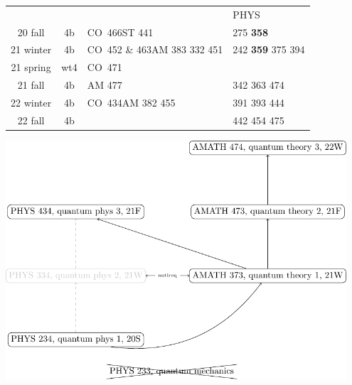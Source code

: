 \documentclass{article}
\newcommand{\co}[1]{{\color{red}CO~#1}}
\begin{document}
\pagestyle{empty}
\begin{table}[h!]
\centering
{}
\begin{adjustbox}{width=\textwidth}
\begin{tabular}{|c | c  | l | l| }
	\hline
	&     &                              & PHYS                                           \\
	20 fall  & 4b  & \co{466}\quad ST 441         & {\tiny 275}  {\bfseries 358}                   \\
	21 winter & 4b  & \co{452 \& 463}\quad  AM 383 {\tiny332 451} &  242 {\bfseries359} {\tiny 375} {\tiny 394} \\
	21 spring & wt4 & \co{471}      &   \\
	21 fall  & 4b  & AM 477 &  342 363  {\tiny 474}  \\
	22 winter & 4b  & \co{434}\quad AM 382 {\tiny 455}         & 391  393 {\tiny 444}            \\
	22 fall  & 4b  &    &  442  454  {\tiny 475} \\ \hline
\end{tabular}
\end{adjustbox}
\end{table}

\vspace{6em}


\includegraphics[width=0.95\textwidth]{../quantum/quantum}
\end{document}
